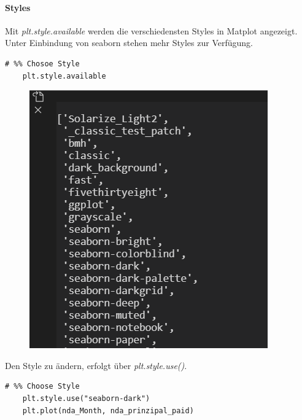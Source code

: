 \paragraph{Styles}
Mit \textit{plt.style.available} werden die verschiedensten Styles in Matplot angezeigt. Unter Einbindung von seaborn stehen mehr Styles zur Verfügung.
\begin{lstlisting}[style=Python]
	# %% Chosoe Style
	plt.style.available
\end{lstlisting}
\begin{figure}[H]
	\centering
	\includegraphics[scale = 0.8]{attachment/chapter_4/Scc017}
\end{figure}
Den Style zu ändern, erfolgt über \textit{plt.style.use()}.
\begin{lstlisting}[style=Python]
	# %% Choose Style
	plt.style.use("seaborn-dark")
	plt.plot(nda_Month, nda_prinzipal_paid)
\end{lstlisting}

